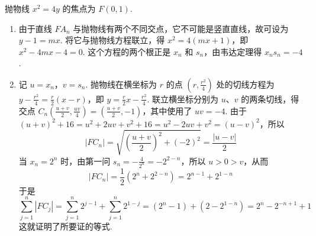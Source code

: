 \begin{solution}
抛物线 \(x^2=4y\) 的焦点为 \(F(0,1)\).

\begin{enumerate}
\item 由于直线 \(FA_n\) 与抛物线有两个不同交点，它不可能是竖直直线，故可设为 \(y-1=mx\). 将它与抛物线方程联立，得 \(x^2=4(mx+1)\)，即 \(x^2-4mx-4=0\). 这个方程的两个根正是 \(x_n\) 和 \(s_n\)，由韦达定理得 \(x_ns_n=-4\).
\item 记 \(u=x_n\)，\(v=s_n\). 抛物线在横坐标为 \(r\) 的点 \(\left(r,\frac{r^2}{4}\right)\) 处的切线方程为 \(y-\frac{r^2}{4}=\frac{r}{2}(x-r)\)，即 \(y=\frac{r}{2}x-\frac{r^2}{4}\). 联立横坐标分别为 \(u\)、\(v\) 的两条切线，得交点 \(C_n\left(\frac{u+v}{2},\frac{uv}{4}\right)=\left(\frac{u+v}{2},-1\right)\)，其中使用了 \(uv=-4\). 由于 \((u+v)^2+16=u^2+2uv+v^2+16=u^2-2uv+v^2=(u-v)^2\)，所以
\[
|FC_n|=\sqrt{\left(\frac{u+v}{2}\right)^2+(-2)^2}=\frac{|u-v|}{2}
\]
当 \(x_n=2^n\) 时，由第一问 \(s_n=-\frac{4}{2^n}=-2^{2-n}\)，所以 \(u>0>v\)，从而
\[
|FC_n|=\frac{1}{2}\left(2^n+2^{2-n}\right)=2^{n-1}+2^{1-n}
\]
于是
\[
\sum_{j=1}^{n}|FC_j|=\sum_{j=1}^{n}2^{j-1}+\sum_{j=1}^{n}2^{1-j}=(2^n-1)+(2-2^{1-n})=2^n-2^{-n+1}+1
\]
这就证明了所要证的等式.
\end{enumerate}
\end{solution}

